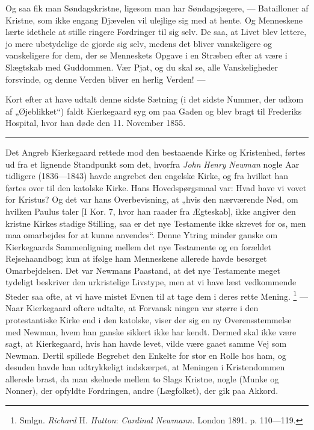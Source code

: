 \documentclass[12pt,a4paper,openany]{book}
\newcommand{\opage}[1]{\marginnote{\footnotesize\textit{[#1]}}}
\begin{document}
Og saa fik man Søndagskristne, ligesom man har Søndagsjægere, --- Batailloner
af Kristne, som ikke engang Djævelen vil ulejlige sig med at hente. Og
Menneskene lærte idethele at stille ringere Fordringer til sig selv. De saa, at
Livet blev lettere, jo mere ubetydelige de gjorde sig selv, medens det bliver
vanskeligere og vanskeligere for dem, der se Menneskets Opgave i en Stræben
efter at være i Slægtskab med Guddommen. Vær Pjat, og du skal se, alle
Vanskeligheder forsvinde, og denne Verden bliver en herlig Verden! ---

Kort efter at have udtalt denne sidste Sætning (i det sidste Nummer, der udkom
af „Øjeblikket“) faldt Kierkegaard syg om paa Gaden og blev bragt til Frederiks
Hospital, hvor han døde den 11. November 1855.

\begin{center}\rule{2cm}{0.4pt}\end{center}

Det Angreb Kierkegaard rettede mod den bestaaende Kirke og Kristenhed, førtes
ud fra et lignende Standpunkt som det, hvorfra \emph{John} \emph{Henry}
\emph{Newman} nogle Aar tidligere (1836---1843) havde angrebet den engelske
Kirke, og fra hvilket han førtes over til den katolske Kirke. Hans
Hovedspørgsmaal var: Hvad have vi vovet for Kristus? Og det var hans
Overbevisning, at „hvis den nærværende Nød, om hvilken Paulus taler [I Kor. 7,
hvor han raader fra Ægteskab], ikke angiver den kristne Kirkes stadige
Stilling, saa er det nye Testamente ikke skrevet for os, men maa omarbejdes for
at kunne anvendes“. Denne Ytring minder ganske om Kierkegaards Sammenligning
mellem det nye Testamente og en forældet Rejsehaandbog; kun at ifølge ham
Menneskene allerede havde besørget Omarbejdelsen. Det var Newmans Paastand, at
det nye Testamente meget tydeligt beskriver den urkristelige Livstype, men at
vi have læst vedkommende Steder saa ofte, at vi have mistet Evnen til at tage
dem i deres rette Mening.%
\footnote[1]{Smlgn. \emph{Richard} H. \emph{Hutton}: \textit{Cardinal Newmann.}
London 1891. p. 110---119.} --- Naar Kierkegaard oftere udtalte, at Forvansk%
\setcounter{footnote}{0}%
\opage{171}ningen var større i den protestantiske Kirke end i den katolske,
viser der sig en ny Overensstemmelse med Newman, hvem han ganske sikkert ikke
har kendt. Dermed skal ikke være sagt, at Kierkegaard, hvis han havde levet,
vilde være gaaet samme Vej som Newman. Dertil spillede Begrebet den Enkelte for
stor en Rolle hos ham, og desuden havde han udtrykkeligt indskærpet, at
Meningen i Kristendommen allerede brast, da man skelnede mellem to Slags
Kristne, nogle (Munke og Nonner), der opfyldte Fordringen, andre (Lægfolket),
der gik paa Akkord.
\end{document}
